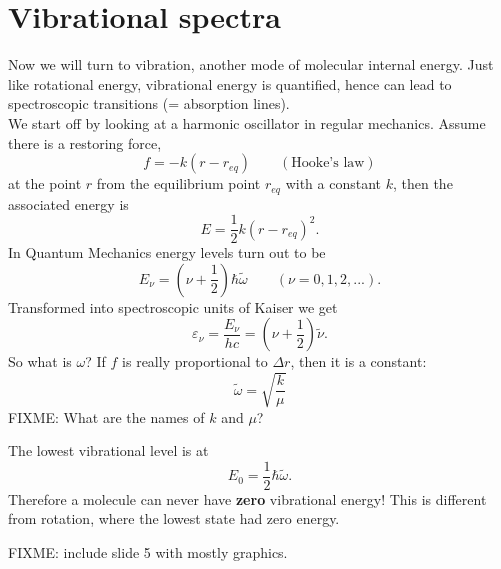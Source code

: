 \documentclass[a4paper,fleqn]{article}
\renewcommand{\epsilon}{\varepsilon}  %
\begin{document}
\section{Vibrational spectra}
Now we will turn to vibration, another mode of molecular internal energy. Just like rotational energy, vibrational energy is quantified, hence can lead to spectroscopic transitions (= absorption lines). \\
We start off by looking at a harmonic oscillator in regular mechanics. Assume there is a restoring force,
\begin{equation}
f = -k (r-r_{eq}) \qquad (\text{Hooke's law})
\end{equation}
at the point $r$ from the equilibrium point $r_{eq}$ with a constant $k$, then the associated energy is
\begin{equation}
E = \frac{1}{2}k (r-r_{eq})^2 .
\end{equation}
In Quantum Mechanics energy levels turn out to be 
\begin{equation}
E_\nu = (\nu+\frac{1}{2})\hbar\tilde{\omega} \qquad (\nu = 0, 1, 2, ...).
\end{equation}
Transformed into spectroscopic units of Kaiser we get
\begin{equation}
\epsilon_\nu = \frac{E_\nu}{hc} = (\nu + \frac{1}{2})\tilde{\nu}.
\end{equation}
So what is $\omega$? If $f$ is really proportional to $\Delta r$, then it is a constant:
\begin{equation}
\tilde{\omega} = \sqrt{\frac{k}{\mu}}
\end{equation}
FIXME: What are the names of $k$ and $\mu$?\par
The lowest vibrational level is at
\begin{equation}
E_0 = \frac{1}{2} \hbar \tilde{\omega}.
\end{equation}
Therefore a molecule can never have \textbf{zero} vibrational energy! This is different from rotation, where the lowest state had zero energy. \par
FIXME: include slide 5 with mostly graphics. \par
\end{document}

